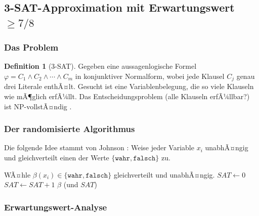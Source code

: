 ﻿\documentclass[12pt,a4paper]{article}
\theoremstyle{definition}
\newtheorem{definition}{Definition}[section]
\theoremstyle{plain}
\theoremstyle{remark}
\begin{document}
\subsection{3-SAT-Approximation mit Erwartungswert $\geq 7/8$}
\label{subsec:3sat}

\subsubsection{Das Problem}

\begin{definition}[3-SAT]\label{def:3sat}
  Gegeben eine aussagenlogische Formel $\varphi = C_1 \wedge C_2 \wedge \cdots
  \wedge C_m$ in konjunktiver Normalform, wobei jede Klausel $C_j$ genau drei
  Literale enthÃ¤lt. Gesucht ist eine Variablenbelegung, die so viele Klauseln
  wie mÃ¶glich erfÃ¼llt. Das Entscheidungsproblem (alle Klauseln erfÃ¼llbar?) ist
  NP-vollstÃ¤ndig \cite{cook1971complexity}.
\end{definition}

\subsubsection{Der randomisierte Algorithmus}

Die folgende Idee stammt von Johnson \cite{johnson1974approximation}:
Weise jeder Variable $x_i$ unabhÃ¤ngig und gleichverteilt einen der Werte
$\{\mathtt{wahr}, \mathtt{falsch}\}$ zu.

\begin{algorithm}[H]
  \caption{Randomisierte 3-SAT-Approximation}
  \label{alg:3sat}
  \begin{algorithmic}[1]
      \State WÃ¤hle $\beta(x_i) \in \{\texttt{wahr}, \texttt{falsch}\}$
             gleichverteilt und unabhÃ¤ngig.
    \EndFor
    \State $\mathit{SAT} \gets 0$
        \State $\mathit{SAT} \gets \mathit{SAT} + 1$
      \EndIf
    \EndFor
    \State \Return $\beta$ (und $\mathit{SAT}$)
  \end{algorithmic}
\end{algorithm}

\subsubsection{Erwartungswert-Analyse}
\end{document}
